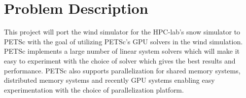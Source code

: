 \section*{Problem Description}

This project will port the wind simulator for the HPC-lab's snow simulator to
PETSc with the goal of utilizing PETSc's GPU solvers in the wind simulation.
PETSc implements a large number of linear system solvers which will make
it easy to experiment with the choice of solver which gives the best results and
performance. PETSc also supports parallelization for shared memory systems,
distributed memory systems and recently GPU systems enabling easy experimentation
with the choice of parallelization platform.
